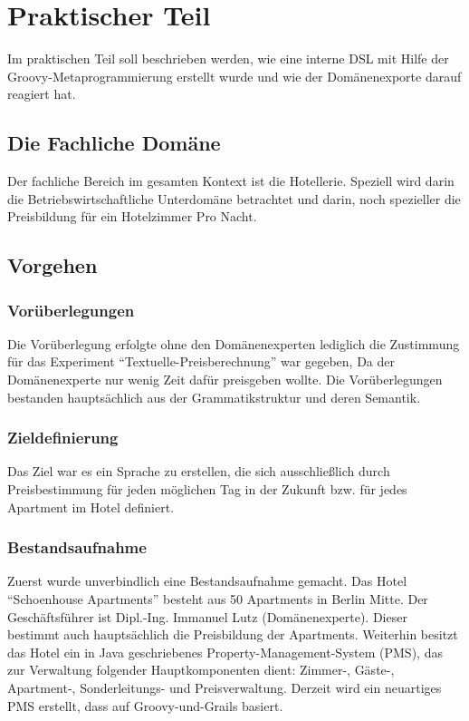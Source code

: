 \documentclass[11pt,english,ngerman, headsepline]{scrreprt}
\begin{document}
 
 
\chapter{Praktischer Teil}

Im praktischen Teil soll beschrieben werden, wie eine interne DSL mit Hilfe der
Groovy-Metaprogrammierung erstellt wurde und wie der Domänenexporte darauf
reagiert hat.

\section{Die Fachliche Domäne}
Der fachliche Bereich im gesamten Kontext ist die Hotellerie. Speziell wird
darin die Betriebswirtschaftliche Unterdomäne betrachtet und darin, noch
spezieller die Preisbildung für ein Hotelzimmer Pro Nacht.

\section{Vorgehen}

\subsection{Vorüberlegungen}

Die Vorüberlegung erfolgte ohne den Domänenexperten lediglich die Zustimmung
für das Experiment ``Textuelle-Preisberechnung'' war gegeben, Da der
Domänenexperte nur wenig Zeit dafür preisgeben wollte. Die Vorüberlegungen
bestanden hauptsächlich aus der Grammatikstruktur und deren Semantik.

\subsection{Zieldefinierung}
Das Ziel war es ein Sprache zu erstellen, die sich ausschließlich durch
Preisbestimmung für jeden möglichen Tag in der Zukunft bzw. für jedes Apartment
im Hotel definiert.
\subsection{Bestandsaufnahme}
Zuerst wurde unverbindlich eine Bestandsaufnahme gemacht. Das Hotel
``Schoenhouse Apartments'' besteht aus 50 Apartments in Berlin Mitte. Der
Geschäftsführer ist Dipl.-Ing. Immanuel Lutz (Domänenexperte). Dieser bestimmt
auch hauptsächlich die Preisbildung der Apartments. Weiterhin besitzt das Hotel ein in Java
geschriebenes Property-Management-System (PMS), das zur Verwaltung folgender
Hauptkomponenten dient: Zimmer-, Gäste-, Apartment-, Sonderleitungs- und
Preisverwaltung.
Derzeit wird ein neuartiges PMS erstellt, dass auf Groovy-und-Grails basiert.
 
\end{document}

